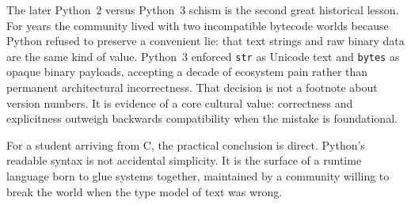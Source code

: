 The later Python~2 versus Python~3 schism is the second great historical lesson. For years the community lived with two incompatible bytecode worlds because Python refused to preserve a convenient lie: that text strings and raw binary data are the same kind of value. Python~3 enforced \texttt{str} as Unicode text and \texttt{bytes} as opaque binary payloads, accepting a decade of ecosystem pain rather than permanent architectural incorrectness. That decision is not a footnote about version numbers. It is evidence of a core cultural value: correctness and explicitness outweigh backwards compatibility when the mistake is foundational.

For a student arriving from C, the practical conclusion is direct. Python's readable syntax is not accidental simplicity. It is the surface of a runtime language born to glue systems together, maintained by a community willing to break the world when the type model of text was wrong.
